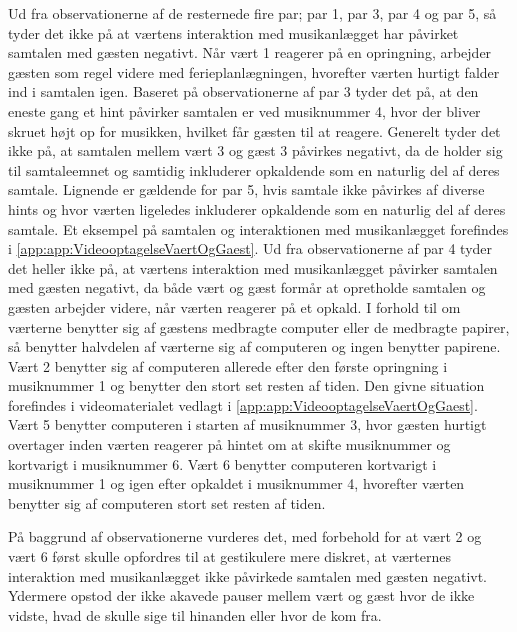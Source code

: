 Ud fra observationerne af de resternede fire par; par 1, par 3, par 4 og par 5, så tyder det ikke på at værtens interaktion med musikanlægget har påvirket samtalen med gæsten negativt. Når vært 1 reagerer på en opringning, arbejder gæsten som regel videre med ferieplanlægningen, hvorefter værten hurtigt falder ind i samtalen igen. Baseret på observationerne af par 3 tyder det på, at den eneste gang et hint påvirker samtalen er ved musiknummer 4, hvor der bliver skruet højt op for musikken, hvilket får gæsten til at reagere. Generelt tyder det ikke på, at samtalen mellem vært 3 og gæst 3 påvirkes negativt, da de holder sig til samtaleemnet og samtidig inkluderer opkaldende som en naturlig del af deres samtale. Lignende er gældende for par 5, hvis samtale ikke påvirkes af diverse hints og hvor værten ligeledes inkluderer opkaldende som en naturlig del af deres samtale. Et eksempel på samtalen og interaktionen med musikanlægget forefindes i \autoref{app:app:VideooptagelseVaertOgGaest}. Ud fra observationerne af par 4 tyder det heller ikke på, at værtens interaktion med musikanlægget påvirker samtalen med gæsten negativt, da både vært og gæst formår at opretholde samtalen og gæsten arbejder videre, når værten reagerer på et opkald. \blankline
%
I forhold til om værterne benytter sig af gæstens medbragte computer eller de medbragte papirer, så benytter halvdelen af værterne sig af computeren og ingen benytter papirene. Vært 2 benytter sig af computeren allerede efter den første opringning i musiknummer 1 og benytter den stort set resten af tiden. Den givne situation forefindes i videomaterialet vedlagt i \autoref{app:app:VideooptagelseVaertOgGaest}. Vært 5 benytter computeren i starten af musiknummer 3, hvor gæsten hurtigt overtager inden værten reagerer på hintet om at skifte musiknummer og kortvarigt i musiknummer 6. Vært 6 benytter computeren kortvarigt i musiknummer 1 og igen efter opkaldet i musiknummer 4, hvorefter værten benytter sig af computeren stort set resten af tiden. 

På baggrund af observationerne vurderes det, med forbehold for at vært 2 og vært 6 først skulle opfordres til at gestikulere mere diskret, at værternes interaktion med musikanlægget ikke påvirkede samtalen med gæsten negativt. Ydermere opstod der ikke akavede pauser mellem vært og gæst hvor de ikke vidste, hvad de skulle sige til hinanden eller hvor de kom fra. 

